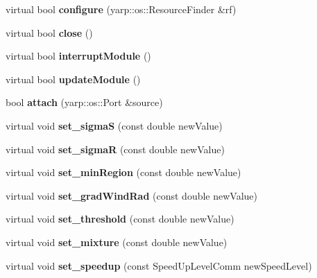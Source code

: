 \begin{DoxyCompactItemize}
\item 
virtual bool {\bfseries configure} (yarp\+::os\+::\+Resource\+Finder \&rf)\label{classEdisonSegmModule_adff5acfcb2411234172937f50071f747}

\item 
virtual bool {\bfseries close} ()\label{classEdisonSegmModule_a01831b02110aa3c2dfb2ae2a235f32c8}

\item 
virtual bool {\bfseries interrupt\+Module} ()\label{classEdisonSegmModule_a050c4fd290134b2c549f1f255b39e3fa}

\item 
virtual bool {\bfseries update\+Module} ()\label{classEdisonSegmModule_a9ec945c0f1cd4246d94255c9d58bbd4f}

\item 
bool {\bfseries attach} (yarp\+::os\+::\+Port \&source)\label{classEdisonSegmModule_a1ac9b550e805a1e1dff863205b70e553}

\item 
virtual void {\bfseries set\+\_\+sigmaS} (const double new\+Value)\label{classEdisonSegmModule_a9331b900b7671ad851f9aa3b4159e0cf}

\item 
virtual void {\bfseries set\+\_\+sigmaR} (const double new\+Value)\label{classEdisonSegmModule_a26d36ebd0382e29033d6b4764b1cfb33}

\item 
virtual void {\bfseries set\+\_\+min\+Region} (const double new\+Value)\label{classEdisonSegmModule_a9f4a7a594ff5ee50d330cb964dd9b48f}

\item 
virtual void {\bfseries set\+\_\+grad\+Wind\+Rad} (const double new\+Value)\label{classEdisonSegmModule_a6add88774ea4794f278988a44d4a64c2}

\item 
virtual void {\bfseries set\+\_\+threshold} (const double new\+Value)\label{classEdisonSegmModule_a63a8a762fcad79343218570b175b755d}

\item 
virtual void {\bfseries set\+\_\+mixture} (const double new\+Value)\label{classEdisonSegmModule_a0993cc82cbd9dfb774e69e40a236787a}

\item 
virtual void {\bfseries set\+\_\+speedup} (const Speed\+Up\+Level\+Comm new\+Speed\+Level)\label{classEdisonSegmModule_af35d584ee6446611e1c483897c86f1fc}


\end{DoxyCompactItemize}
